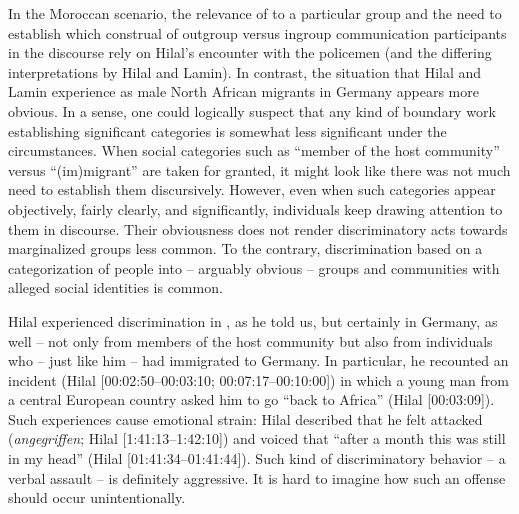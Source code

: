 \documentclass[output=paper,colorlinks,citecolor=brown]{langscibook}
\begin{document}
In the Moroccan scenario, the relevance of  to a particular group and the need to establish which construal of outgroup versus ingroup communication participants in the discourse rely on Hilal's encounter with the policemen (and the differing interpretations by Hilal and Lamin). In contrast, the situation that Hilal and Lamin experience as male North African migrants in Germany appears more obvious. In a sense, one could logically suspect that any kind of boundary work establishing significant categories is somewhat less significant under the circumstances. When social categories such as ``member of the host community'' versus ``(im)migrant'' are taken for granted, it might look like there was not much need to establish them discursively. However, even when such categories appear objectively, fairly clearly, and significantly, individuals keep drawing attention to them in discourse. Their obviousness does not render discriminatory acts towards marginalized groups less common. To the contrary, discrimination based on a categorization of people into -- arguably obvious -- groups and communities with alleged social identities is common. 

Hilal experienced discrimination in , as he told us, but certainly in Germany, as well -- not only from members of the host community but also from individuals who -- just like him -- had immigrated to Germany. In particular, he recounted an incident (Hilal [00:02:50--00:03:10; 00:07:17--00:10:00]) in which a young man from a central European country asked him to go ``back to Africa'' (Hilal [00:03:09]). Such experiences cause emotional strain: Hilal described that he felt attacked (\textit{angegriffen}; Hilal [1:41:13--1:42:10]) and voiced that ``after a month this was still in my head'' (Hilal [01:41:34--01:41:44]). Such kind of discriminatory behavior -- a verbal assault -- is definitely aggressive. It is hard to imagine how such an offense should occur unintentionally. 
\end{document}
